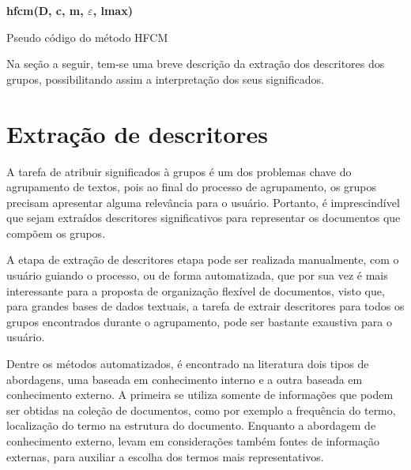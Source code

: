 \begin{algorithm}[!htp]
  \SetAlgoLined 
  \textbf{{\color{blue}hfcm}(D, c, m, $\varepsilon$, lmax)}\\
  \caption{Pseudo código do método HFCM}
  \label{alg:hfcm} 
\end{algorithm}

Na seção a seguir, tem-se uma breve descrição da extração dos descritores dos grupos, possibilitando
assim a interpretação dos seus significados.

\section{Extração de descritores} 

A tarefa de atribuir significados à grupos é um dos problemas chave do agrupamento de textos, pois
ao final do processo de agrupamento, os grupos precisam apresentar alguma relevância para o
usuário\cite{Zhang2008}. Portanto, é imprescindível que sejam extraídos descritores significativos
para representar os documentos que compõem os grupos.

A etapa de extração de descritores etapa pode ser realizada manualmente, com o usuário guiando o
processo, ou de forma automatizada, que por sua vez é mais interessante para a proposta de
organização flexível de documentos, visto que, para grandes bases de dados textuais, a tarefa de
extrair descritores para todos os grupos encontrados durante o agrupamento, pode ser bastante
exaustiva para o usuário.

Dentre os métodos automatizados, é encontrado na literatura dois tipos de abordagens, uma baseada em
conhecimento interno e a outra baseada em conhecimento externo\cite{Nogueira2013}.  A primeira se
utiliza somente de informações que podem ser obtidas na coleção de documentos, como por exemplo a
frequência do termo, localização do termo na estrutura do documento.  Enquanto a abordagem de
conhecimento externo, levam em considerações também fontes de informação externas, para auxiliar a
escolha dos termos mais representativos. 

